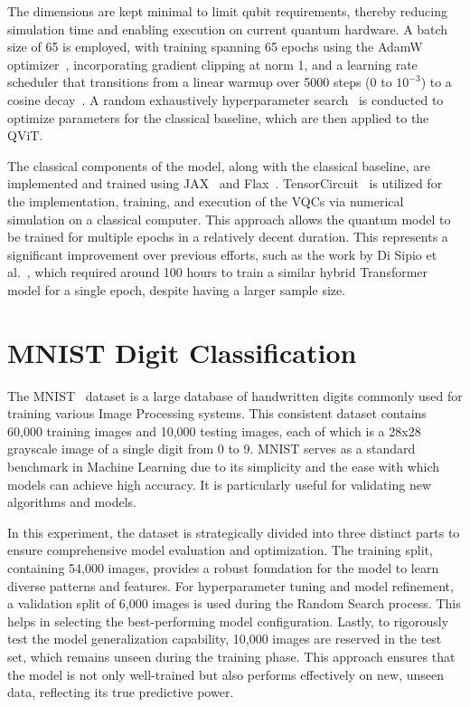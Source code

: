 \documentclass[12pt,a4paper]{report}
\begin{document}
The dimensions are kept minimal to limit qubit requirements, thereby reducing simulation time and enabling execution on current quantum hardware. A batch size of 65 is employed, with training spanning 65 epochs using the AdamW optimizer~\cite{zhang2018improved}, incorporating gradient clipping at norm 1, and a learning rate scheduler that transitions from a linear warmup over 5000 steps (0 to $10^{-3}$) to a cosine decay~\cite{learningrate2}. A random exhaustively hyperparameter search~\cite{randomsearch} is conducted to optimize parameters for the classical baseline, which are then applied to the QViT.

The classical components of the model, along with the classical baseline, are implemented and trained using JAX~\cite{bradbury2018jax} and Flax~\cite{heek2020flax,Comajoan_Cara_2024}. TensorCircuit~\cite{Zhang_2023} is utilized for the implementation, training, and execution of the VQCs via numerical simulation on a classical computer. This approach allows the quantum model to be trained for multiple epochs in a relatively decent duration. This represents a significant improvement over previous efforts, such as the work by Di Sipio et al.~\cite{di2022dawn}, which required around 100 hours to train a similar hybrid Transformer model for a single epoch, despite having a larger sample size.

\section{MNIST Digit Classification}
The MNIST~\cite{lecun2010mnist} dataset is a large database of handwritten digits commonly used for training various Image Processing systems. This consistent dataset contains 60,000 training images and 10,000 testing images, each of which is a 28x28 grayscale image of a single digit from 0 to 9. MNIST serves as a standard benchmark in Machine Learning due to its simplicity and the ease with which models can achieve high accuracy. It is particularly useful for validating new algorithms and models.

In this experiment, the dataset is strategically divided into three distinct parts to ensure comprehensive model evaluation and optimization. The training split, containing 54,000 images, provides a robust foundation for the model to learn diverse patterns and features. For hyperparameter tuning and model refinement, a validation split of 6,000 images is used during the Random Search process. This helps in selecting the best-performing model configuration. Lastly, to rigorously test the model generalization capability, 10,000 images are reserved in the test set, which remains unseen during the training phase. This approach ensures that the model is not only well-trained but also performs effectively on new, unseen data, reflecting its true predictive power.
\end{document}
